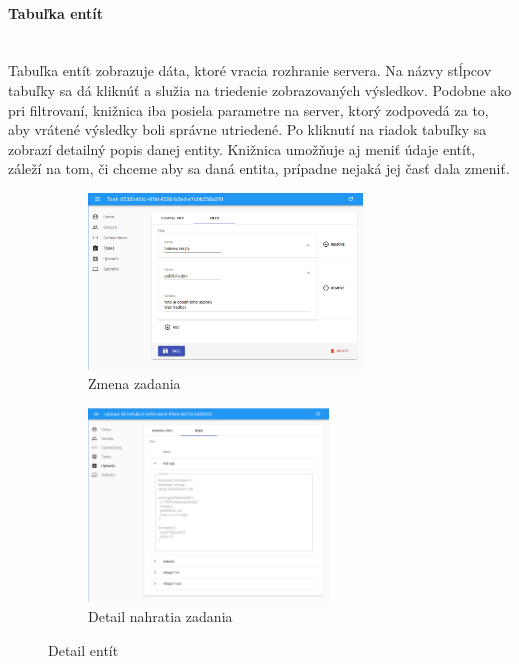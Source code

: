 \paragraph{Tabuľka entít}\leavevmode\\
Tabuľka entít zobrazuje dáta, ktoré vracia rozhranie servera. Na názvy stĺpcov tabuľky sa dá kliknúť a
služia na triedenie zobrazovaných výsledkov. Podobne ako pri filtrovaní, knižnica iba posiela 
parametre na server, ktorý zodpovedá za to, aby vrátené výsledky boli správne utriedené.
Po kliknutí na riadok tabuľky sa zobrazí detailný popis danej entity. Knižnica umožňuje aj meniť 
údaje entít, záleží na tom, či chceme aby sa daná entita, prípadne nejaká jej časť dala zmeniť.
\begin{figure}[H]
\centering
\begin{subfigure}{.5\textwidth}
  \centering
  \includegraphics[width=0.8\textwidth]{images/zmena_zadania}
  \caption[Zmena zadania]{Zmena zadania}
  \label{obr:zmena_zadania}
\end{subfigure}%
\begin{subfigure}{.5\textwidth}
  \centering
  \includegraphics[width=0.7\textwidth]{images/detail_nahratia}
  \caption[Detail nahratia zadania]{Detail nahratia zadania}
  \label{obr:detail_nahratia}
\end{subfigure}
\caption{Detail entít}
\end{figure}

